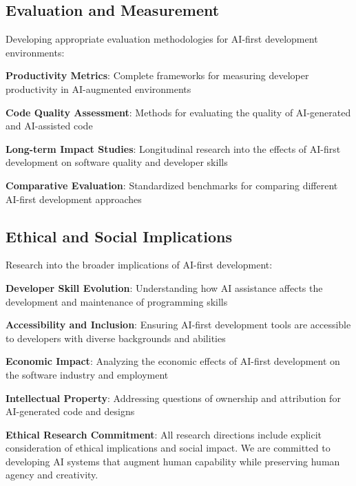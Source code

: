 \subsection*{Evaluation and Measurement}

Developing appropriate evaluation methodologies for AI-first development environments:

\begin{expandedlist}
    \item \textbf{Productivity Metrics}: Complete frameworks for measuring developer productivity in AI-augmented environments
    \item \textbf{Code Quality Assessment}: Methods for evaluating the quality of AI-generated and AI-assisted code
    \item \textbf{Long-term Impact Studies}: Longitudinal research into the effects of AI-first development on software quality and developer skills
    \item \textbf{Comparative Evaluation}: Standardized benchmarks for comparing different AI-first development approaches
\end{expandedlist}

\subsection*{Ethical and Social Implications}

Research into the broader implications of AI-first development:

\begin{expandedlist}
    \item \textbf{Developer Skill Evolution}: Understanding how AI assistance affects the development and maintenance of programming skills
    \item \textbf{Accessibility and Inclusion}: Ensuring AI-first development tools are accessible to developers with diverse backgrounds and abilities
    \item \textbf{Economic Impact}: Analyzing the economic effects of AI-first development on the software industry and employment
    \item \textbf{Intellectual Property}: Addressing questions of ownership and attribution for AI-generated code and designs
\end{expandedlist}

\begin{alertbox}
\textbf{Ethical Research Commitment}: All research directions include explicit consideration of ethical implications and social impact. We are committed to developing AI systems that augment human capability while preserving human agency and creativity.
\end{alertbox}

